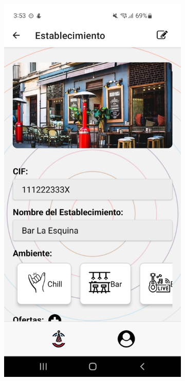 \clearpage
\vspace*{\fill}
\begin{figure}[H]
    \centering
    \begin{subfigure}{0.45\textwidth}
        \centering
        \includegraphics[width=\linewidth]{imagenes/Capturas/DatosEstablecimiento.jpeg}

\end{subfigure}
\end{figure}
